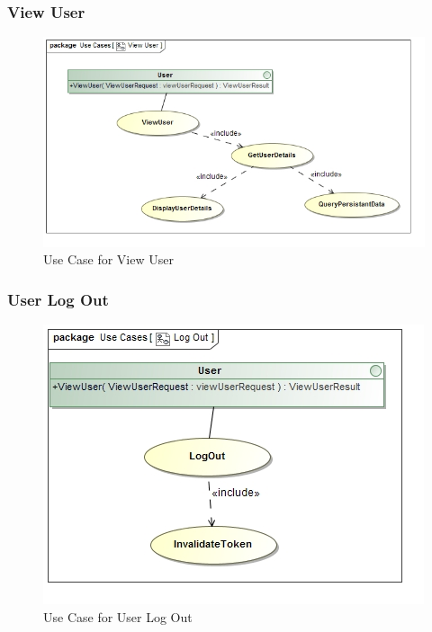 \documentclass[a4paper,10pt]{article}
\begin{document}
\subsubsection{View User}
	\begin{figure}[h]
		\includegraphics[scale=0.5]{UseViewUser}
	\caption{Use Case for View User}
	\end{figure}
		
\subsubsection{User Log Out}
	\begin{figure}[h]
		\includegraphics[scale=0.5]{UseLogOut}
	\caption{Use Case for User Log Out}
	\end{figure}
	
\end{document}
